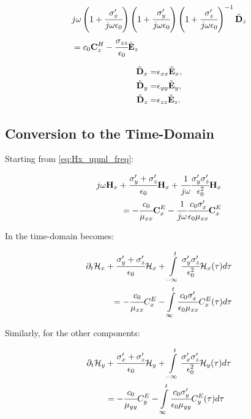 \begin{small}
    \begin{align}
        &j\omega\pare{1 + \cfrac{\sigma_x\Prime}{j\omega\epsilon_0}} \pare{1 + \cfrac{\sigma_y\Prime}{j\omega\epsilon_0}} \pare{1 + \cfrac{\sigma_z\Prime}{j\omega\epsilon_0}}\inverse \Dnw_z \nonumber \\
        &= c_0\CHzw - \cfrac{\sigma_{zz}}{\epsilon_0}\Enw_z
        \label{eq:Ez_upml_freq}
    \end{align}

    \begin{align}
        \tilde{\textbf{D}}_x =& \epsilon_{xx} \tilde{\textbf{E}}_x, \\
        \tilde{\textbf{D}}_y =& \epsilon_{yy} \tilde{\textbf{E}}_y, \\
        \tilde{\textbf{D}}_z =& \epsilon_{zz} \tilde{\textbf{E}}_z. 
    \end{align}

\end{small}

\subsection{Conversion to the Time-Domain}

Starting from \eqref{eq:Hx_upml_freq}:


\begin{align}
    j\omega \textbf{H}_x + \cfrac{\sigma_y^{\prime} + \sigma_z^{\prime}}{\epsilon_0}\textbf{H}_x + \cfrac{1}{j\omega}\cfrac{\sigma_y^{\prime}\sigma_z^{\prime}}{\epsilon_0^2}\textbf{H}_x \nonumber \\
    = -\cfrac{c_0}{\mu_{xx}}\textbf{C}_x^E - \cfrac{1}{j\omega}\cfrac{c_0\sigma_x^{\prime}}{\epsilon_0\mu_{xx}}\textbf{C}_x^E
\end{align}

In the time-domain becomes:

\begin{align}
    \partial_t\mathcal{H}_x + \cfrac{\sigma_y^{\prime} + \sigma_z^{\prime}}{\epsilon_0}\mathcal{H}_x + \int\limits_{-\infty}^t\cfrac{\sigma_y^{\prime}\sigma_z^{\prime}}{\epsilon_0^2}\mathcal{H}_x(\tau)d\tau \nonumber \\
    = -\cfrac{c_0}{\mu_{xx}}C_x^E - \int\limits_{\infty}^t\cfrac{c_0\sigma_x^{\prime}}{\epsilon_0\mu_{xx}}C_x^E(\tau)d\tau
    \label{eq:Hx_upml_time}
\end{align}

Similarly, for the other components:

\begin{align}
    \partial_t\mathcal{H}_y &+ \cfrac{\sigma_x^{\prime} + \sigma_z^{\prime}}{\epsilon_0}\mathcal{H}_y + \int\limits_{-\infty}^t\cfrac{\sigma_x^{\prime}\sigma_z^{\prime}}{\epsilon_0^2}\mathcal{H}_y(\tau)d\tau \nonumber \\
    &= -\cfrac{c_0}{\mu_{yy}}C_y^E - \int\limits_{\infty}^t\cfrac{c_0\sigma_y^{\prime}}{\epsilon_0\mu_{yy}}C_y^E(\tau)d\tau
    \label{eq:Hy_upml_time}
\end{align}

